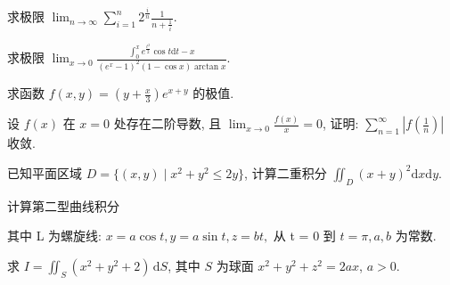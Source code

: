 \par{}
求极限 $\lim_{n\to \infty}\sum_{i = 1}^{n}2^{\frac{i}{n}}\frac{1}{n + \frac{1}{i}}.$\par
\par{}
求极限 $\lim_{x\to 0}\frac{\int_0^x e^{\frac{t^2}{2}}\cos t\mathrm{d}t - x}{(e^x - 1)^2(1 - \cos x)\arctan x}.$\par
\par{}
求函数 $f(x, y) = \left(y + \frac{x}{3}\right)e^{x + y}$ 的极值.\par
\par{}
设 $f(x)$ 在 $x = 0$ 处存在二阶导数, 且 $\lim_{x \to 0} \frac{f(x)}{x} = 0$, 证明: $\sum_{n=1}^{\infty} \left| f\left(\frac{1}{n}\right) \right|$ 收敛.\par
\par{}
已知平面区域 $D = \{(x, y) \mid x^2 + y^2 \leq 2y\}$, 计算二重积分 $\iint_{D} (x + y)^2 \mathrm{d}x \mathrm{d}y$.\par
\par{}
\par{}
计算第二型曲线积分\par
\nopagebreak[4]
其中 L 为螺旋线:  $x = a \cos t, y = a \sin t, z = bt,$  从 t = 0 到  $t = \pi, a, b$  为常数.\par
\par{}
求 $I = \iint_{S} (x^{2} + y^{2} + 2) \, \mathrm{d}S$, 其中 $S$ 为球面 $x^{2} + y^{2} + z^{2} = 2ax$, $a > 0$.\par
\par{}
